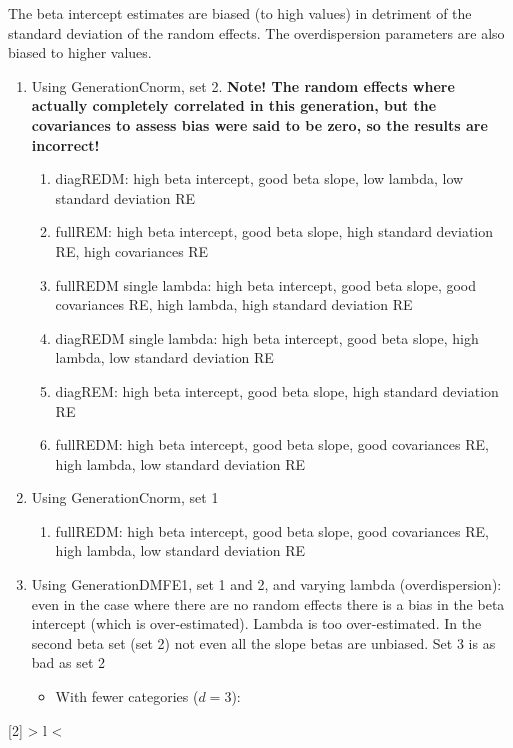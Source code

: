 \documentclass{article}
\begin{document}
The beta intercept estimates are biased (to high values) in detriment of the standard deviation of the random effects. The overdispersion parameters are also biased to higher values.
\begin{enumerate}
\item Using GenerationCnorm, set 2. \textbf{Note! The random effects where actually completely correlated in this generation, but the covariances to assess bias were said to be zero, so the results are incorrect!}
	\begin{enumerate}
		\item diagREDM: high beta intercept, good beta slope, low lambda, low standard deviation RE
		\item fullREM: high beta intercept, good beta slope, high standard deviation RE, high covariances RE
		\item fullREDM single lambda: high beta intercept, good beta slope, good covariances RE, high lambda, high standard deviation RE
		\item diagREDM single lambda: high beta intercept, good beta slope, high lambda, low standard deviation RE
		\item diagREM: high beta intercept, good beta slope, high standard deviation RE
		\item fullREDM: high beta intercept, good beta slope, good covariances RE, high lambda, low standard deviation RE
	\end{enumerate}
\item Using GenerationCnorm, set 1
	\begin{enumerate}
		\item fullREDM: high beta intercept, good beta slope, good covariances RE, high lambda, low standard deviation RE
\end{enumerate}
\item Using GenerationDMFE1, set 1 and 2, and varying lambda (overdispersion): even in the case where there are no random effects there is a bias in the beta intercept (which is over-estimated). Lambda is too over-estimated. In the second beta set (set 2) not even all the slope betas are unbiased. Set 3 is as bad as set 2
\begin{itemize}
\item With fewer categories ($d=3$): 
\end{itemize}
\end{enumerate}


\newcolumntype{R}[2]{%
    >{\bgroup}%
    l%
    <{\egroup}%
}
\newcommand*\rot{\multicolumn{1}{R{45}{1em}}}%
\end{document}
